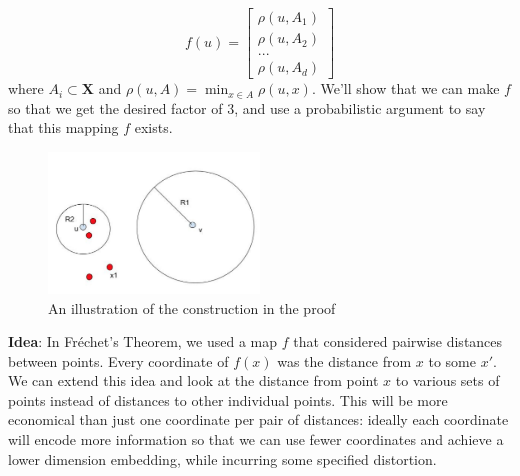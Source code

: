 \[
f(u)=
\begin{bmatrix}
    \rho (u,A_1)\\
    \rho (u,A_2)\\
    ...\\
    \rho (u,A_d)
\end{bmatrix}
\]
where $A_i \subset \mathbf{X}$ and $\rho (u,A) = \min_{x \in A} 
\rho(u,x)$. We'll show that we can make $f$ so that
we get the desired factor of $3$, and use a probabilistic 
argument to say that this mapping $f$ exists.\\

\begin{figure}[h!]
\begin{center}
\includegraphics[width=0.5\textwidth]{chapter_5/files/construction.jpg}
\caption{An illustration of the construction in the proof}
\end{center}
\end{figure}

\textbf{Idea}: In Fr\'echet's Theorem, we used a map $f$
that considered pairwise distances between points. Every
coordinate of $f(x)$ was the distance from $x$ to some
$x'$. We can extend this idea and look at the distance from
point $x$ to various sets of points instead of distances 
to other individual points. 
This will be more economical than just one coordinate
per pair of distances: ideally each coordinate will encode
more information so that we can use fewer coordinates and 
achieve a lower dimension 
embedding, while incurring some specified distortion.\\

